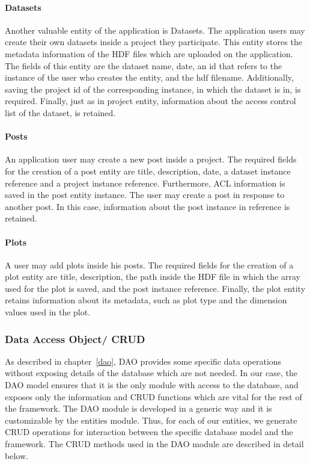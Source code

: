 \paragraph{Datasets}
Another valuable entity of the application is Datasets. The application users may create their own datasets inside a project they participate. This entity stores the metadata information of the HDF files which are uploaded on the application. The fields of this entity are the dataset name, date, an id that refers to the instance of the user who creates the entity, and the hdf filename. Additionally, saving the project id of the corresponding instance, in which the dataset is in, is required. Finally, just as in project entity, information about the access control list of the dataset, is retained.
\paragraph{Posts}
An application user may create a new post inside a project. The required fields for the creation of a post entity are title, description, date, a dataset instance reference and a project instance reference. Furthermore, ACL information  is saved in the post entity instance. The user may create a post in response to another post. In this case, information about the post instance in reference is retained.
\paragraph{Plots}
A user may add plots inside his posts. The required fields for the creation of a plot entity are title, description, the path inside the HDF file in which the array used for the plot is saved, and the post instance reference. Finally, the plot entity retains information about its metadata, such as plot type and the dimension values used in the plot.

\subsubsection{Data Access Object/ CRUD}
\label{daocrud}
As described in chapter~\ref{dao}, DAO provides some specific data operations without exposing details of the database which are not needed. In our case, the DAO model ensures that it is the only module with access to the database, and exposes only the information and CRUD functions which are vital for the rest of the framework. The DAO module is developed in a generic way and it is customizable by the entities module. Thus, for each of our entities, we generate CRUD operations for interaction between the specific database model and the framework. The CRUD methods used in the DAO module are described in detail below.

